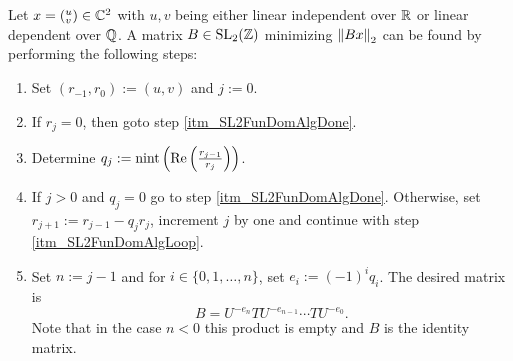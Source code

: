 \begin{theorem}
\label{thm_SL2FunDomAlg}
Let $x = ({}^u_v) \in \mathbb{C}^2$ with $u,v$ being either linear independent over $\mathbb{R}$ or linear dependent over $\mathbb{Q}$. A matrix $B \in \operatorname{SL}_{2}(\mathbb{Z})$ minimizing $\left\| Bx \right\|_2$ can be found by performing the following steps:
\begin{enumerate}
\item Set $(r_{-1},r_0) := (u,v)$ and $j := 0$.
\item \label{itm_SL2FunDomAlgLoop}
If $r_j = 0$, then goto step \ref{itm_SL2FunDomAlgDone}.
\item Determine $q_j := \operatorname{nint}\left( \operatorname{Re}\left(\frac{r_{j-1}}{r_j}\right) \right)$.
\item If $j > 0$ and $q_j = 0$ go to step \ref{itm_SL2FunDomAlgDone}. Otherwise, set $r_{j+1} := r_{j-1} - q_j r_j$, increment $j$ by one and continue with step \ref{itm_SL2FunDomAlgLoop}.
\item \label{itm_SL2FunDomAlgDone} Set $n := j-1$ and for $i \in \{0,1,\dots,n\}$, set $e_i := (-1)^i q_i$. The desired matrix is
\begin{equation}
\label{eqn_SL2FunDomMinMat}
B = U^{-e_n} TU^{-e_{n-1}} \cdots TU^{-e_0}.
\end{equation}
Note that in the case $n < 0$ this product is empty and $B$ is the identity matrix.
\end{enumerate}
\end{theorem}

